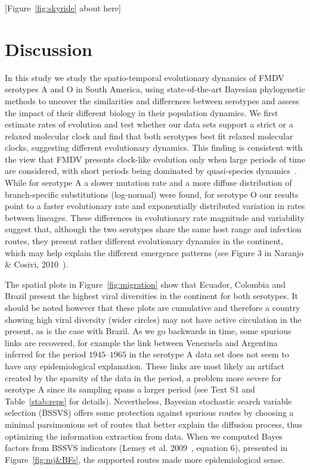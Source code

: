 \documentclass[10pt]{article}
\begin{document}
\begin{center}
 [Figure~\ref{fig:skyride} about here]
\end{center}

\section*{Discussion}
% 
In this study we study the  spatio-temporal evolutionary dynamics of FMDV serotypes A and O in South America, using state-of-the-art Bayesian phylogenetic methods to uncover the similarities and differences between serotypes and assess the impact of their different biology in their population dynamics.
We first estimate rates of evolution and test whether our data sets support a strict or a relaxed molecular clock and find that both serotypes best fit relaxed molecular clocks, suggesting different evolutionary dynamics.
This finding is consistent with the view that FMDV presents clock-like evolution only when large periods of time are considered, with short periods being dominated by quasi-species dynamics~\cite{Muellner2011}.  
While for serotype A a slower mutation rate and a more diffuse distribution of branch-specific substitutions (log-normal) were found, for serotype O our results point to a faster evolutionary rate and exponentially distributed variation in rates between lineages.
These differences in evolutionary rate magnitude and variability suggest that, although the two serotypes share the same host range and infection routes, they present rather different evolutionary dynamics in the continent, which may help explain the different emergence patterns (see Figure 3 in Naranjo \& Cosivi, 2010~\cite{Naranjo2013}). 

The spatial plots in Figure~\ref{fig:migration} show that Ecuador, Colombia and Brazil present the highest viral diversities in the continent for both serotypes.
It should be noted however that these plots are cumulative and therefore a country showing high viral diversity (wider circles) may not have active circulation in the present, as is the case with Brazil.
As we go backwards in time, some spurious links are recovered, for example the link between Venezuela and Argentina inferred for the period $1945$--$1965$ in the serotype A data set does not seem to have any epidemiological explanation.
These links are most likely an artifact created by the sparsity of the data in the period, a problem more severe for serotype A since its sampling spans a larger period (see Text S1 and Table~\ref{stab:reps} for details).
Nevertheless, Bayesian stochastic search variable selection (BSSVS) offers some protection against spurious routes by choosing a minimal parsimonious set of routes that better explain the diffusion process, thus optimizing the information extraction from data. 
When we computed Bayes factors from BSSVS indicators (Lemey et al. 2009~\cite{roots}, equation 6), presented in Figure~\ref{fig:mj&BFs}, the supported routes made more epidemiological sense.
%
\end{document}
